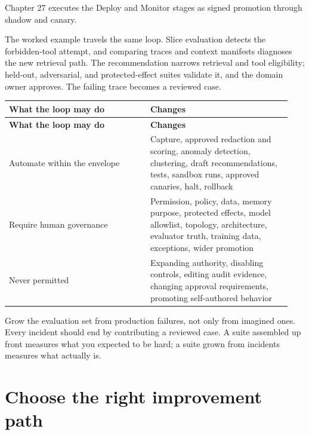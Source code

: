 \BookTableEnd

Chapter 27 executes the Deploy and Monitor stages as signed promotion through shadow and canary.\par

The worked example travels the same loop. Slice evaluation detects the forbidden-tool attempt, and comparing traces and context manifests diagnoses the new retrieval path. The recommendation narrows retrieval and tool eligibility; held-out, adversarial, and protected-effect suites validate it, and the domain owner approves. The failing trace becomes a reviewed case.\par

\BookTableStart
\small
\begin{longtable}{@{}Y{0.4700\linewidth}Y{0.4700\linewidth}@{}}
\color{white}\bfseries \textbf{What the loop may do} & \color{white}\bfseries \textbf{Changes} \\
\endfirsthead
{}
\color{white}\bfseries \textbf{What the loop may do} & \color{white}\bfseries \textbf{Changes} \\
\endhead
Automate within the envelope & Capture, approved redaction and scoring, anomaly detection, clustering, draft recommendations, tests, sandbox runs, approved canaries, halt, rollback \\
Require human governance & Permission, policy, data, memory purpose, protected effects, model allowlist, topology, architecture, evaluator truth, training data, exceptions, wider promotion \\
Never permitted & Expanding authority, disabling controls, editing audit evidence, changing approval requirements, promoting self-authored behavior \\
\end{longtable}
\BookTableEnd

\begin{bookbestpractice}
Grow the evaluation set from production failures, not only from imagined ones. Every incident should end by contributing a reviewed case. A suite assembled up front measures what you expected to be hard; a suite grown from incidents measures what actually is.
\end{bookbestpractice}

\section{Choose the right improvement path}

